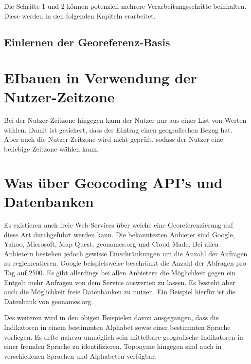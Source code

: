 				Die Schritte 1 und 2 können potenziell mehrere Verarbeitungsschritte beinhalten. 
				Diese werden in den folgenden Kapiteln erarbeitet. 





			\subsection{Einlernen der Georeferenz-Basis}




\section{EIbauen in Verwendung der Nutzer-Zeitzone} 

Bei der Nutzer-Zeitzone hingegen kann der Nutzer nur aus einer List von Werten wählen. 
				Damit ist gesichert, dass der EIntrag einen geografischen Bezug hat. 
				Aber auch die Nutzer-Zeitzone wird nicht geprüft, sodass der Nutzer eine beliebige Zeitzone wählen kann. 


\section{Was über Geocoding API's und Datenbanken}


				Es existieren auch freie Web-Services über welche eine Georeferenzierung auf diese Art durchgeführt werden kann. 
				Die bekanntesten Anbieter sind Google, Yahoo, Microsoft, Map Quest, geonames.org und Cloud Made. 
				Bei allen Anbietern bestehen jedoch gewisse Einschränkungen um die Anzahl der Anfragen zu reglementieren.
				Google beispielsweise beschränkt die Anzahl der Abfragen pro Tag auf 2500.
				Es gibt allerdings bei allen Anbietern die Möglichkeit gegen ein Entgelt mehr Anfragen von dem Service auswerten zu lassen.
				Es besteht aber auch die Möglichkeit freie Datenbanken zu nutzen. 
				Ein Beispiel hierfür ist die Datenbank von geonames.org.
				

				
	
Des weiteren wird in den obigen Beispielen davon ausgegangen, dass die Indikatoren in einem bestimmten Alphabet sowie einer bestimmten Sprache vorliegen.
Es drfte nahezu unmöglich sein mittelbare geografische Indikatoren in einer fremden Sprache zu identifizieren.
Toponyme hingegen sind auch in verschiedenen Sprachen und Alphabeten verfügbar. 









	